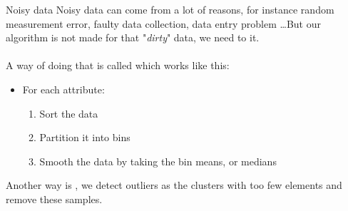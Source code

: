 \begin{parag}{Noisy data}
    Noisy data can come from a lot of reasons, for instance random measurement error, faulty data collection, data entry problem \ldots But our algorithm is not made for that "\textit{dirty}" data, we need to  it.\\
	$ $\\
	A way of doing that is called  which works like this:
	\begin{itemize}
	    \item For each attribute:
			\begin{enumerate}
				\item Sort the data
				\item Partition it into bins
				\item Smooth the data by taking the bin means, or medians
			\end{enumerate}
	\end{itemize}
	Another way is , we detect outliers as the clusters with too few elements and remove these samples.
\end{parag}
